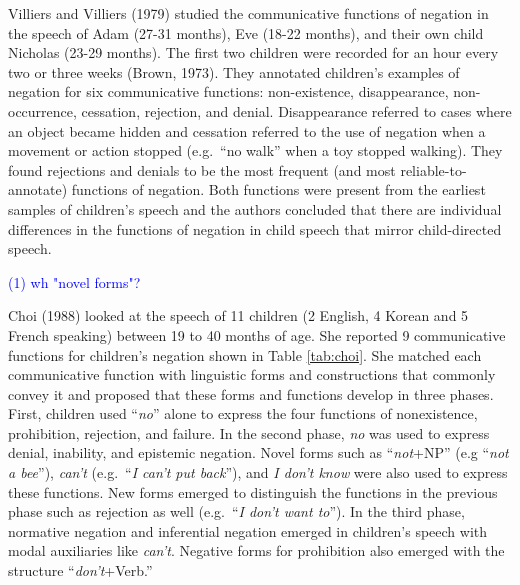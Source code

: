 \documentclass[
  english,
  man,floatsintext]{apa6}
\begin{document}
Villiers and Villiers (1979) studied the communicative functions of negation in the speech of Adam (27-31 months), Eve (18-22 months), and their own child Nicholas (23-29 months). The first two children were recorded for an hour every two or three weeks (Brown, 1973). They annotated children's examples of negation for six communicative functions: non-existence, disappearance, non-occurrence, cessation, rejection, and denial. Disappearance referred to cases where an object became hidden and cessation referred to the use of negation when a movement or action stopped (e.g.~``no walk'' when a toy stopped walking). They found rejections and denials to be the most frequent (and most reliable-to-annotate) functions of negation. Both functions were present from the earliest samples of children's speech and the authors concluded that there are individual differences in the functions of negation in child speech that mirror child-directed speech.

\textcolor{blue}{(1) wh "novel forms"?}

Choi (1988) looked at the speech of 11 children (2 English, 4 Korean and 5 French speaking) between 19 to 40 months of age. She reported 9 communicative functions for children's negation shown in Table \ref{tab:choi}. She matched each communicative function with linguistic forms and constructions that commonly convey it and proposed that these forms and functions develop in three phases. First, children used ``\emph{no}'' alone to express the four functions of nonexistence, prohibition, rejection, and failure. In the second phase, \emph{no} was used to express denial, inability, and epistemic negation. Novel forms such as ``\emph{not}+NP'' (e.g ``\emph{not a bee}''), \emph{can't} (e.g.~``\emph{I can't put back}''), and \emph{I don't know} were also used to express these functions. New forms emerged to distinguish the functions in the previous phase such as rejection as well (e.g.~``\emph{I don't want to}''). In the third phase, normative negation and inferential negation emerged in children's speech with modal auxiliaries like \emph{can't}. Negative forms for prohibition also emerged with the structure ``\emph{don't}+Verb.''
\end{document}
